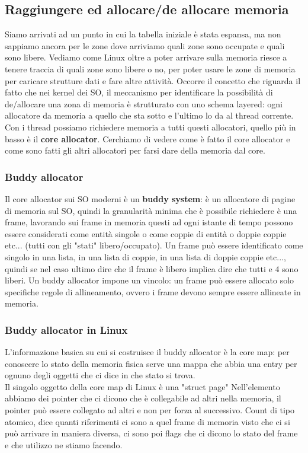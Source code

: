\documentclass[12pt, oneside]{extbook}
\begin{document}
\subsection{Raggiungere ed allocare/de allocare memoria}
Siamo arrivati ad un punto in cui la tabella iniziale è stata espansa, ma non sappiamo ancora per le zone dove arriviamo quali zone sono occupate e quali sono libere. Vediamo come Linux oltre a poter arrivare sulla memoria riesce a tenere traccia di quali zone sono libere o no, per poter usare le zone di memoria per caricare strutture dati e fare altre attività. Occorre il concetto che riguarda il fatto che nei kernel dei SO, il meccanismo per identificare la possibilità di de/allocare una zona di memoria è strutturato con uno schema layered: ogni allocatore da memoria a quello che sta sotto e l'ultimo lo da al thread corrente. Con i thread possiamo richiedere memoria a tutti questi allocatori, quello più in basso è il \textbf{core allocator}. Cerchiamo di vedere come è fatto il core allocator e come sono fatti gli altri allocatori per farsi dare della memoria dal core.
\subsubsection{Buddy allocator}
Il core allocator sui SO moderni è un \textbf{buddy system}: è un allocatore di pagine di memoria sul SO, quindi la granularità minima che è possibile richiedere è una frame, lavorando sui frame in memoria questi ad ogni istante di tempo possono essere considerati come entità singole o come coppie di entità o doppie coppie etc... (tutti con gli "stati" libero/occupato). Un frame può essere identificato come singolo in una lista, in una lista di coppie, in una lista di doppie coppie etc..., quindi se nel caso ultimo dire che il frame è libero implica dire che tutti e 4 sono liberi. Un buddy allocator impone un vincolo: un frame può essere allocato solo specifiche regole di allineamento, ovvero i frame devono sempre essere allineate in memoria.
\subsubsection{Buddy allocator in Linux}
L'informazione basica su cui si costruisce il buddy allocator è la core map: per conoscere lo stato della memoria fisica serve una mappa che abbia una entry per ognuno degli oggetti che ci dice in che stato si trova.\\ Il singolo oggetto della core map di Linux è una "struct page"
Nell'elemento abbiamo dei pointer che ci dicono che è collegabile ad altri nella memoria, il pointer può essere collegato ad altri e non per forza al successivo. Count di tipo atomico, dice quanti riferimenti ci sono a quel frame di memoria visto che ci si può arrivare in maniera diversa, ci sono poi flags che ci dicono lo stato del frame e che utilizzo ne stiamo facendo.
\end{document}
